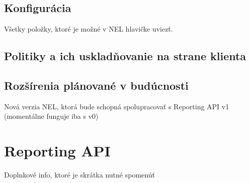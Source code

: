 \subsection{Konfigurácia}

Všetky položky, ktoré je možné v NEL hlavičke uviezť.

\subsection{Politiky a ich uskladňovanie na strane klienta}
\label{nel-policies}


\subsection{Rozšírenia plánované v budúcnosti}

Nová verzia NEL, ktorá bude schopná spolupracovať s Reporting API v1 (momentálne funguje iba s v0)



\section{Reporting API}
\label{reporting-api}

Doplnkové info, ktoré je skrátka nutné spomenúť \cite{W3C-reporting-api}